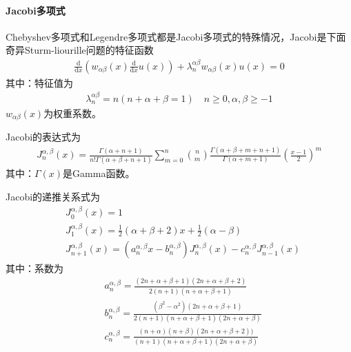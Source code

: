                 \paragraph{Jacobi多项式}
                Chebyshev多项式和Legendre多项式都是Jacobi多项式的特殊情况，Jacobi是下面奇异Sturm-liourille问题的特征函数
                \begin{align*}
                    \frac{\mathrm{d}}{\mathrm{d}x}(w_{\alpha \beta}(x) \frac {\mathrm{d}}{\mathrm{d}x} u(x)) +
                    \lambda_n^{\alpha \beta } w_{\alpha \beta}(x) u(x) = 0
                \end{align*}
                其中：特征值为
                \begin{align*}
                    \lambda_n^{\alpha \beta } = n(n+\alpha +\beta =1) \quad n \geqslant 0,\alpha,\beta \geqslant -1
                \end{align*}
                $w_{\alpha \beta}(x)$为权重系数。
                \par
                Jacobi的表达式为
                \begin{align*}
                    J_n^{\alpha ,\beta} (x) = \frac{\Gamma(\alpha +n+1)}{n!\Gamma(\alpha +\beta+n+1)}
                    \sum_{m = 0}^n \binom{n}{m} \frac{\Gamma(\alpha +\beta+m+n+1)}{\Gamma(\alpha +m+1)}
                    \left( \frac{x-1}{2}\right)^m
                \end{align*}
                其中：$\Gamma(x)$是Gamma函数。
                \par
                Jacobi的递推关系式为
                \begin{align*}
                    &J_{0}^{\alpha ,\beta}(x) = 1\\
                    &J_{1}^{\alpha ,\beta}(x) = \frac{1}{2} (\alpha + \beta+2)x + \frac{1}{2}(\alpha - \beta)\\
                    &J_{n+1}^{\alpha ,\beta}(x) = (a_n^{\alpha ,\beta}x - b_n^{\alpha ,\beta})J_{n}^{\alpha ,\beta}(x)
                    - c_n^{\alpha ,\beta} J_{n-1}^{\alpha ,\beta}(x)
                \end{align*}
                其中：系数为
                \begin{align*}
                    &a_n^{\alpha ,\beta} = \frac{(2n+\alpha + \beta +1)(2n + \alpha + \beta +2)}{2(n+1) (n + \alpha + \beta + 1)}\\
                    &b_n^{\alpha ,\beta} = \frac{(\beta ^2 - \alpha^2) (2n+ \alpha + \beta + 1)}{2(n+1) (n + \alpha + \beta + 1) (2n + \alpha + \beta )}\\
                    &c_n^{\alpha ,\beta} = \frac{(n+\alpha)(n+\beta)(2n+ \alpha + \beta +2))}{(n+1)(n + \alpha + \beta + 1)(2n + \alpha + \beta )}
                \end{align*}
